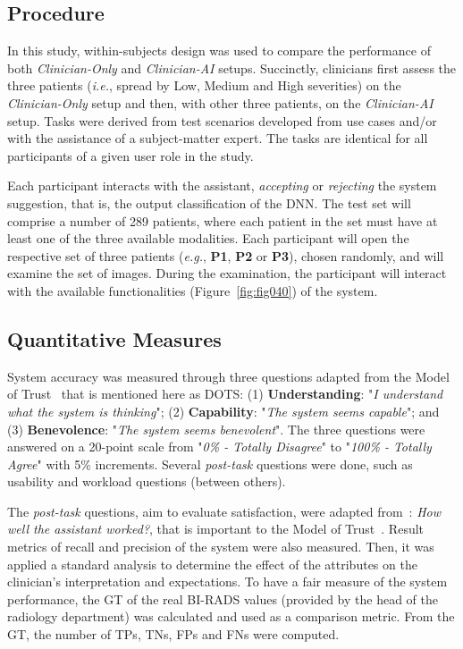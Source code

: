 \subsection{Procedure}
\label{sec:sec006005004}

In this study, within-subjects design was used to compare the performance of both {\it Clinician-Only} and {\it Clinician-AI} setups.
Succinctly, clinicians first assess the three patients ({\it i.e.}, spread by Low, Medium and High severities) on the {\it Clinician-Only} setup and then, with other three patients, on the {\it Clinician-AI} setup.
Tasks were derived from test scenarios developed from use cases and/or with the assistance of a subject-matter expert.
The tasks are identical for all participants of a given user role in the study.

Each participant interacts with the assistant, {\it accepting} or {\it rejecting} the system suggestion, that is, the output classification of the \ac{DNN}.
The test set will comprise a number of 289 patients, where each patient in the set must have at least one of the three available modalities.
Each participant will open the respective set of three patients ({\it e.g.}, {\bf P1}, {\bf P2} or {\bf P3}), chosen randomly, and will examine the set of images.
During the examination, the participant will interact with the available functionalities (Figure~\ref{fig:fig040}) of the system.

\subsection{Quantitative Measures}
\label{sec:sec006005005}

System accuracy was measured through three questions adapted from the Model of Trust~\cite{schoorman2016perspective} that is mentioned here as \ac{DOTS}: (1) {\bf Understanding}: "{\it I understand what the system is thinking}"; (2) {\bf Capability}: "{\it The system seems capable}"; and (3) {\bf Benevolence}: "{\it The system seems benevolent}".
The three questions were answered on a 20-point scale from "{\it 0\% - Totally Disagree}" to "{\it 100\% - Totally Agree}" with 5\% increments.
Several {\it post-task} questions were done, such as usability and workload questions (between others).

The {\it post-task} questions, aim to evaluate satisfaction, were adapted from~\cite{Kocielnik:2019:YAI:3290605.3300641}: {\it How well the assistant worked?}, that is important to the Model of Trust~\cite{basheer2015certainty, khalid2016prediction}.
Result metrics of recall and precision of the system were also measured.
Then, it was applied a standard analysis to determine the effect of the attributes on the clinician's interpretation and expectations.
To have a fair measure of the system performance, the \ac{GT} of the real \ac{BI-RADS} values (provided by the head of the radiology department) was calculated and used as a comparison metric.
From the \ac{GT}, the number of \acfp{TP}, \acfp{TN}, \acfp{FP} and \acfp{FN} were computed.

